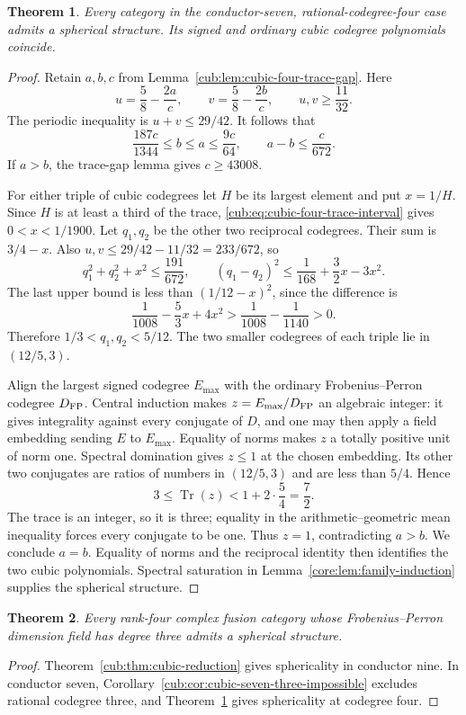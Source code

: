\documentclass[11pt,a4paper]{article}
\newtheorem{theorem}{Theorem}[section]
\theoremstyle{definition}\newtheorem{definition}[theorem]{Definition}
\theoremstyle{remark}\newtheorem{remark}[theorem]{Remark}
\DeclareMathOperator{\Tr}{Tr}
\numberwithin{equation}{section}
\begin{document}
\begin{theorem}\label{cub:thm:cubic-four-spherical}
Every category in the conductor-seven, rational-codegree-four case
admits a spherical structure. Its signed and ordinary cubic codegree
polynomials coincide.
\end{theorem}
\begin{proof}
Retain $a,b,c$ from Lemma~\ref{cub:lem:cubic-four-trace-gap}. Here
\[
 u=\frac58-\frac{2a}{c},\qquad
 v=\frac58-\frac{2b}{c},\qquad
 u,v\ge\frac{11}{32}.
\]
The periodic inequality is $u+v\le29/42$. It follows that
\begin{equation}\label{cub:eq:cubic-four-trace-interval}
 \frac{187c}{1344}\le b\le a\le\frac{9c}{64},
 \qquad a-b\le\frac{c}{672}.
\end{equation}
If $a>b$, the trace-gap lemma gives $c\ge43008$.

For either triple of cubic codegrees let $H$ be its largest element
and put $x=1/H$. Since $H$ is at least a third of the trace,
\eqref{cub:eq:cubic-four-trace-interval} gives $0<x<1/1900$.
Let $q_1,q_2$ be the other two reciprocal codegrees. Their sum is
$3/4-x$. Also $u,v\le29/42-11/32=233/672$, so
\[
 q_1^2+q_2^2+x^2\le\frac{191}{672},\qquad
 (q_1-q_2)^2\le\frac1{168}+\frac32x-3x^2.
\]
The last upper bound is less than $(1/12-x)^2$, since the difference is
\[
 \frac1{1008}-\frac53x+4x^2
 >\frac1{1008}-\frac1{1140}>0.
\]
Therefore $1/3<q_1,q_2<5/12$. The two smaller codegrees of each
triple lie in $(12/5,3)$.

Align the largest signed codegree $E_{\max}$ with the ordinary
Frobenius--Perron codegree $D_{\rm FP}$. Central induction makes
$z=E_{\max}/D_{\rm FP}$ an algebraic integer: it gives integrality
against every conjugate of $D$, and one may then apply a field
embedding sending $E$ to $E_{\max}$. Equality of norms makes $z$
a totally positive unit of norm one. Spectral domination gives
$z\le1$ at the chosen embedding. Its other two conjugates are ratios
of numbers in $(12/5,3)$ and are less than $5/4$. Hence
\[
 3\le\Tr(z)<1+2\cdot\frac54=\frac72.
\]
The trace is an integer, so it is three; equality in the
arithmetic--geometric mean inequality forces every conjugate to be
one. Thus $z=1$, contradicting $a>b$.
We conclude $a=b$. Equality of norms and the reciprocal identity
then identifies the two cubic polynomials. Spectral saturation in
Lemma~\ref{core:lem:family-induction} supplies the spherical structure.
\end{proof}

\begin{theorem}\label{cub:thm:cubic-classification}
Every rank-four complex fusion category whose Frobenius--Perron
dimension field has degree three admits a spherical structure.
\end{theorem}
\begin{proof}
Theorem~\ref{cub:thm:cubic-reduction} gives sphericality in conductor
nine. In conductor seven, Corollary~\ref{cub:cor:cubic-seven-three-impossible}
excludes rational codegree three, and Theorem~\ref{cub:thm:cubic-four-spherical}
gives sphericality at codegree four.
\end{proof}
\end{document}
